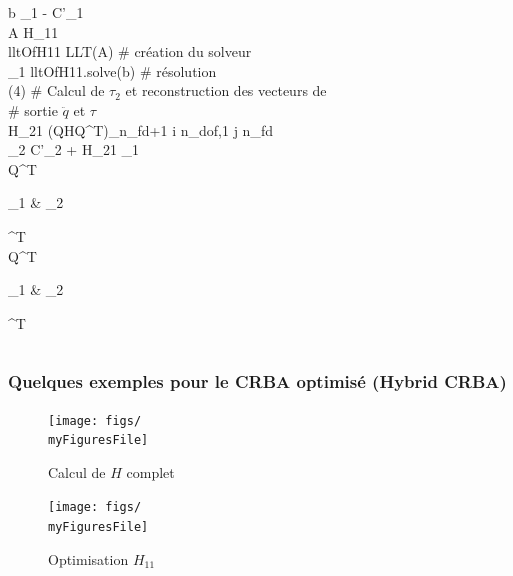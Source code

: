 \documentclass[10pt]{beamer}
\begin{document}
\begin{frame}
\begin{spacing}{1.5}
\begin{columns}[T]
\begin{column}{.48\textwidth}
\begin{pseudocode}{ }{ }
	  b \GETS \tau_1 - C'_1 \\
	  A \GETS H_{11} \\
	  lltOfH11 \GETS LLT(A) \hfill \textnormal{\# création du solveur} \\
	  _1 \GETS lltOfH11.solve(b) \hfill \textnormal{\# résolution} 
	\END \\
	(4) 
	\BEGIN
	  \textnormal{\# Calcul de $\tau_2$ et reconstruction des vecteurs de} \\
	  \textnormal{\# sortie $\ddot{q}$ et $\tau$} \\
	   H_{21} \GETS (QHQ^T)_{n_{fd+1} \leqslant i \leqslant n_{dof},1 \leqslant j \leqslant n_{fd}} \\
	  \tau_2 \GETS C'_2 + H_{21} _1 \\
	  \tau \GETS Q^T \begin{bmatrix} \tau_1 & \tau_2 \end{bmatrix}^T \\
	   \GETS Q^T \begin{bmatrix} _1 & _2 \end{bmatrix}^T
	\END 
	\end{pseudocode}
	\end{column}
	\end{columns}
	\end{spacing}
  \vfill
	  
\end{frame}

\begin{frame}
  \frametitle{Quelques exemples pour le CRBA optimisé (Hybrid CRBA)}
  
	\begin{figure}[H]
	  \begin{center}
	  \texttt{[image: figs/\\myFiguresFile]}
	  \caption{Calcul de $H$ complet}
	  \texttt{[image: figs/\\myFiguresFile]}
	  \caption{Optimisation $H_{11}$}
	  \end{center}
	\end{figure}
	
\end{frame}


\end{document}
